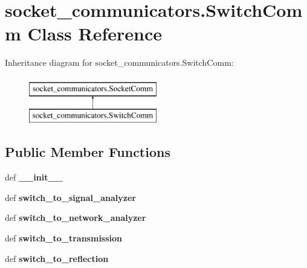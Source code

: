 \hypertarget{classsocket__communicators_1_1_switch_comm}{\section{socket\-\_\-communicators.\-Switch\-Comm Class Reference}
\label{classsocket__communicators_1_1_switch_comm}
}
Inheritance diagram for socket\-\_\-communicators.\-Switch\-Comm\-:\begin{figure}[H]
\begin{center}
\leavevmode
\includegraphics[height=2.000000cm]{classsocket__communicators_1_1_switch_comm}
\end{center}
\end{figure}
\subsection*{Public Member Functions}
\begin{DoxyCompactItemize}
\item 
\hypertarget{classsocket__communicators_1_1_switch_comm_adb41c0348172ce6135ce8de27218bc3e}{def {\bfseries \-\_\-\-\_\-init\-\_\-\-\_\-}}\label{classsocket__communicators_1_1_switch_comm_adb41c0348172ce6135ce8de27218bc3e}

\item 
\hypertarget{classsocket__communicators_1_1_switch_comm_a3c2f4e11a2511c8ff23da6f62128aa40}{def {\bfseries switch\-\_\-to\-\_\-signal\-\_\-analyzer}}\label{classsocket__communicators_1_1_switch_comm_a3c2f4e11a2511c8ff23da6f62128aa40}

\item 
\hypertarget{classsocket__communicators_1_1_switch_comm_a56cf447121385106dd502c138aa19fda}{def {\bfseries switch\-\_\-to\-\_\-network\-\_\-analyzer}}\label{classsocket__communicators_1_1_switch_comm_a56cf447121385106dd502c138aa19fda}

\item 
\hypertarget{classsocket__communicators_1_1_switch_comm_ab505ce5be6fc65df85a6e4134838fe4c}{def {\bfseries switch\-\_\-to\-\_\-transmission}}\label{classsocket__communicators_1_1_switch_comm_ab505ce5be6fc65df85a6e4134838fe4c}

\item 
\hypertarget{classsocket__communicators_1_1_switch_comm_a437d3ccf253331bf906c3d37f5d394ba}{def {\bfseries switch\-\_\-to\-\_\-reflection}}\label{classsocket__communicators_1_1_switch_comm_a437d3ccf253331bf906c3d37f5d394ba}

\end{DoxyCompactItemize}
